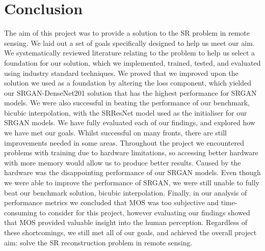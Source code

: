 \section{Conclusion}
The aim of this project was to provide a solution to the SR problem in remote sensing. We laid out a set of goals specifically designed to help us meet our aim. We systematically reviewed literature relating to the problem to help us select a foundation for our solution, which we implemented, trained, tested, and evaluated using industry standard techniques. We proved that we improved upon the solution we used as a foundation by altering the loss component, which yielded our SRGAN-DenseNet201 solution that has the highest performance for SRGAN models. We were also successful in beating the performance of our benchmark, bicubic interpolation, with the SRResNet model used as the initialiser for our SRGAN models. We have fully evaluated each of our findings, and explored how we have met our goals. Whilst successful on many fronts, there are still improvements needed in some areas. Throughout the project we encountered problems with training due to hardware limitations, so accessing better hardware with more memory would allow us to produce better results. Caused by the hardware was the disappointing performance of our SRGAN models. Even though we were able to improve the performance of SRGAN, we were still unable to fully beat our benchmark solution, bicubic interpolation. Finally, in our analysis of performance metrics we concluded that MOS was too subjective and time-consuming to consider for this project, however evaluating our findings showed that MOS provided valuable insight into the human perception. Regardless of these shortcomings, we still met all of our goals, and achieved the overall project aim: solve the SR reconstruction problem in remote sensing.


